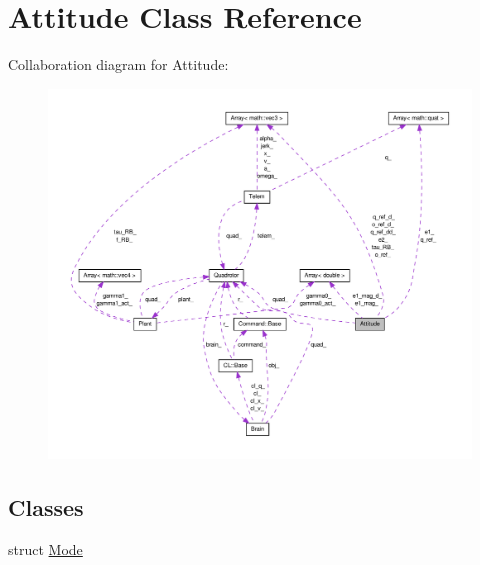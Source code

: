 \hypertarget{classAttitude}{\section{\-Attitude \-Class \-Reference}
\label{classAttitude}
}


\-Collaboration diagram for \-Attitude\-:\nopagebreak
\begin{figure}[H]
\begin{center}
\leavevmode
\includegraphics[width=350pt]{classAttitude__coll__graph}
\end{center}
\end{figure}
\subsection*{\-Classes}
\begin{DoxyCompactItemize}
\item 
struct \hyperlink{structAttitude_1_1Mode}{\-Mode}
\end{DoxyCompactItemize}
